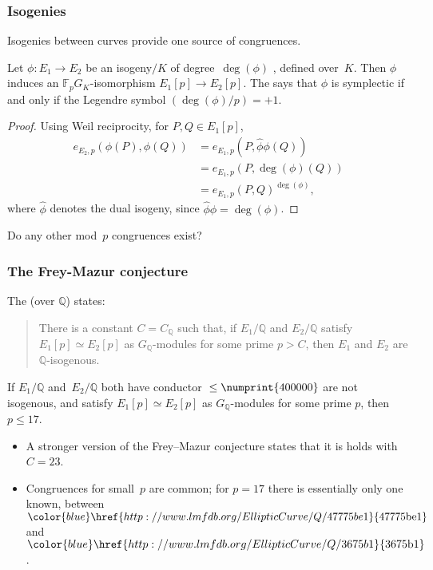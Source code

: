 \documentclass[compress]{beamer}
\newcommand{\Q}{\mathbb Q}
\newcommand{\F}{\mathbb F}
\newcommand{\lmfdbec}[3]{\color{blue}\href{http://www.lmfdb.org/EllipticCurve/Q/#1#2#3}{{\text{\rm#1#2#3}}}}
\newcommand{\high}[1]{\emph{\color{blue}{#1}}}
\begin{document}
\begin{frame}\frametitle{Isogenies}
  Isogenies between curves provide one source of congruences.
  \pause\medskip

  Let $\phi:E_1\to E_2$ be an isogeny$/K$ of degree~$\deg(\phi)$
  \high{coprime to $p$}, defined over~$K$.  Then $\phi$ induces an
  $\F_pG_K$-isomorphism $E_1[p]\to E_2[p]$.  The \high{isogeny criterion}
  says that $\phi$ is symplectic if and only if the Legendre symbol
  $({\deg(\phi)}/{p})=+1$.
  \pause\medskip

  \begin{proof}
    Using Weil reciprocity, for $P,Q\in E_1[p]$,
    \[
    \begin{aligned}
      e_{E_2,p}(\phi(P), \phi(Q)) &= e_{E_1,p}(P, \hat\phi\phi(Q)) \\
      &= e_{E_1,p}(P, \deg(\phi)(Q))\\ &= e_{E_1,p}(P,
      Q)^{\deg(\phi)},
    \end{aligned}
  \]
  where $\hat{\phi}$ denotes the dual isogeny, since $\hat\phi\phi=\deg(\phi)$.
  \end{proof}
  \pause\medskip

  Do any other mod~$p$ congruences exist?
\end{frame}

\begin{frame}\frametitle{The Frey-Mazur conjecture}
  The \high{Uniform Frey--Mazur conjecture} (over $\Q$) states:

  \begin{quote}There is a constant $C=C_{\Q}$ such that, if $E_1/\Q$ and $E_2/\Q$
  satisfy $E_1[p] \simeq E_2[p]$ as $G_\Q$-modules for some prime $p >
  C$, then $E_1$ and $E_2$ are $\Q$-isogenous.
  \end{quote}

  \pause\medskip

  \begin{theorem}[C. \& Freitas]
  If $E_1/\Q$ and~$E_2/\Q$ both have conductor ${}\le\numprint{400000}$
  are not isogenous, and satisfy $E_1[p] \simeq E_2[p]$ as
  $G_\Q$-modules for some prime $p$, then $p\le17$.
  \end{theorem}

  \pause\medskip
  \begin{itemize}
    \item A stronger version of the Frey--Mazur conjecture states that
      it is holds with $C=23$.
      \item Congruences for small~$p$ are common; for $p=17$ there is
        essentially only one known, between $\lmfdbec{47775}{be}{1}$
        and~$\lmfdbec{3675}{b}{1}$.
  \end{itemize}

\end{frame}
\end{document}
